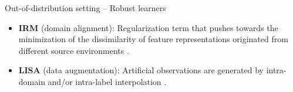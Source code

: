 \begin{frame}
    \centering
    \Huge{\insertsection}  %
\end{frame}

\begin{frame}{Out-of-distribution setting -- Robust learners}
	\begin{itemize}
		\item \textbf{IRM} (domain alignment): Regularization term that pushes towards the minimization of the dissimilarity of
		feature representations originated from different source environments \cite{arjovskyInvariantRiskMinimization2020}.
		\item \textbf{LISA} (data augmentation): Artificial observations are generated by intra-domain and/or intra-label
		interpolation \cite{yaoImprovingOutofDistributionRobustness2022}.
	\end{itemize}


\end{frame}
